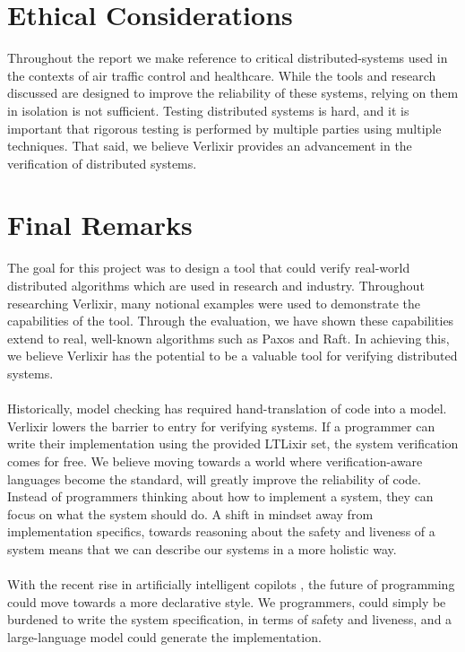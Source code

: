 \section{Ethical Considerations}
Throughout the report we make reference to critical distributed-systems used in the contexts of air traffic control and healthcare. While the tools and research discussed are designed to improve the reliability of these systems, relying on them in isolation is not sufficient. Testing distributed systems is hard, and it is important that rigorous testing is performed by multiple parties using multiple techniques. That said, we believe Verlixir provides an advancement in the verification of distributed systems.
\section{Final Remarks}
The goal for this project was to design a tool that could verify real-world distributed algorithms which are used in research and industry. Throughout researching Verlixir, many notional examples were used to demonstrate the capabilities of the tool. Through the evaluation, we have shown these capabilities extend to real, well-known algorithms such as Paxos and Raft. In achieving this, we believe Verlixir has the potential to be a valuable tool for verifying distributed systems.
\\ \\
Historically, model checking has required hand-translation of code into a model. Verlixir lowers the barrier to entry for verifying systems. If a programmer can write their implementation using the provided LTLixir set, the system verification comes for free. We believe moving towards a world where verification-aware languages become the standard, will greatly improve the reliability of code. Instead of programmers thinking about how to implement a system, they can focus on what the system should do. A shift in mindset away from implementation specifics, towards reasoning about the safety and liveness of a system means that we can describe our systems in a more holistic way.
\\ \\
With the recent rise in artificially intelligent copilots \cite{attention_is, copilot_asset,safety_ai}, the future of programming could move towards a more declarative style. We programmers, could simply be burdened to write the system specification, in terms of safety and liveness, and a large-language model could generate the implementation.